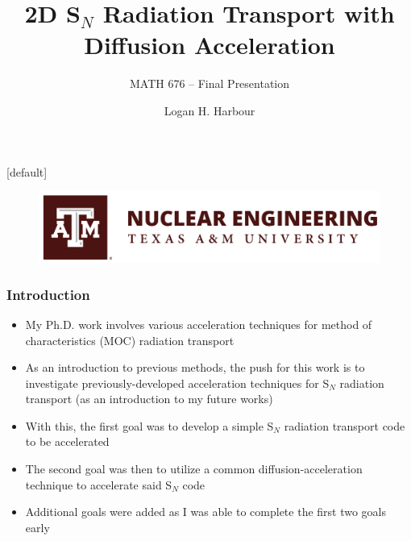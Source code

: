 \documentclass[xcolor={usenames,dvipsnames,svgnames,table}, 10pt]{beamer}
\title[2D S$_N$ with Diffusion Acceleration]{2D S$_N$ Radiation Transport with Diffusion Acceleration}
\subtitle{MATH 676 -- Final Presentation}
\author[Logan Harbour]{Logan H. Harbour}
\institute[]{Department of Nuclear Engineering \\ Texas A\&M University}
\date[May 1, 2019]
\begin{document}
{
[default] 
\begin{frame}
\vfill
\titlepage
\vfill
\begin{figure}[t]
	\centering
	\includegraphics[width=.5\textwidth]{images/nuen}
\end{figure}
\vfill
\end{frame}
}


\begin{frame}\frametitle{Introduction}
	\begin{block}{}
		\begin{itemize}
			\item My Ph.D. work involves various acceleration techniques for method of characteristics (MOC) radiation transport
			\item As an introduction to previous methods, the push for this work is to investigate previously-developed acceleration techniques for S$_N$ radiation transport (as an introduction to my future works)
			\item With this, the first goal was to develop a simple S$_N$ radiation transport code to be accelerated
			\item The second goal was then to utilize a common diffusion-acceleration technique to accelerate said S$_N$ code
			\item Additional goals were added as I was able to complete the first two goals early
		\end{itemize}
	\end{block}
\end{frame}

\end{document}
